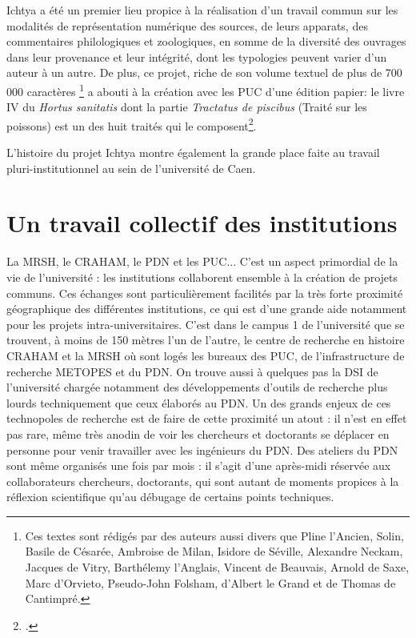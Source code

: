 \documentclass[a4paper,12pt,twoside]{book}
\begin{document}
   Ichtya a été un premier lieu propice à la réalisation d'un travail commun sur les modalités de représentation numérique des sources, de leurs apparats, des commentaires philologiques et zoologiques, en somme de la diversité des ouvrages dans leur provenance et leur intégrité, dont les typologies peuvent varier d'un auteur à un autre. De plus, ce projet, riche de son volume textuel de plus de 700 000 caractères \footnote{Ces textes sont rédigés par des auteurs aussi divers que Pline l'Ancien, Solin, Basile de Césarée, Ambroise de Milan, Isidore de Séville, Alexandre Neckam, Jacques de Vitry, Barthélemy l'Anglais, Vincent de Beauvais, Arnold de Saxe, Marc d'Orvieto, Pseudo-John Folsham, d'Albert le Grand et de Thomas de Cantimpré.} a abouti à la création avec les \acrfull{PUC} d'une édition papier: le livre IV du \textit{Hortus sanitatis} dont la partie \textit{ Tractatus de piscibus} (Traité sur les poissons) est un des huit traités qui le composent\footcite{noauthor_piscibus_nodate}. 
   
   L'histoire du projet Ichtya montre également la grande place faite au travail pluri-institutionnel au sein de l'université de Caen.
    
\chapter{Un travail collectif des institutions}
    La \acrshort{MRSH}, le \acrshort{CRAHAM}, le \acrshort{PDN} et les \acrshort{PUC}... C'est un aspect primordial de la vie de l'université : les institutions collaborent ensemble à la création de projets communs. Ces échanges sont particulièrement facilités par la très forte proximité géographique des différentes institutions, ce qui est d'une grande aide notamment pour les projets intra-universitaires. C'est dans le campus 1 de l'université que se trouvent, à moins de 150 mètres l'un de l'autre, le centre de recherche en histoire \acrshort{CRAHAM} et la \acrshort{MRSH} où sont logés les bureaux des \acrfull{PUC}, de l'infrastructure de recherche \acrshort{METOPES} et du \acrlong{PDN}. On trouve aussi à quelques pas la \acrfull{DSI} de l'université chargée notamment des développements d'outils de recherche plus lourds techniquement que ceux élaborés au \acrshort{PDN}. Un des grands enjeux de ces \og technopoles \fg{} de recherche est de faire de cette proximité un atout : il n'est en effet pas rare, même très anodin de voir les chercheurs et doctorants se déplacer en personne pour venir travailler avec les ingénieurs du \acrshort{PDN}. Des \og ateliers du \acrshort{PDN}\fg{} sont même organisés une fois par mois : il s'agit d'une après-midi réservée aux collaborateurs chercheurs, doctorants, qui sont autant de moments propices à la réflexion scientifique qu'au débugage de certains points techniques. 
    
\end{document}

